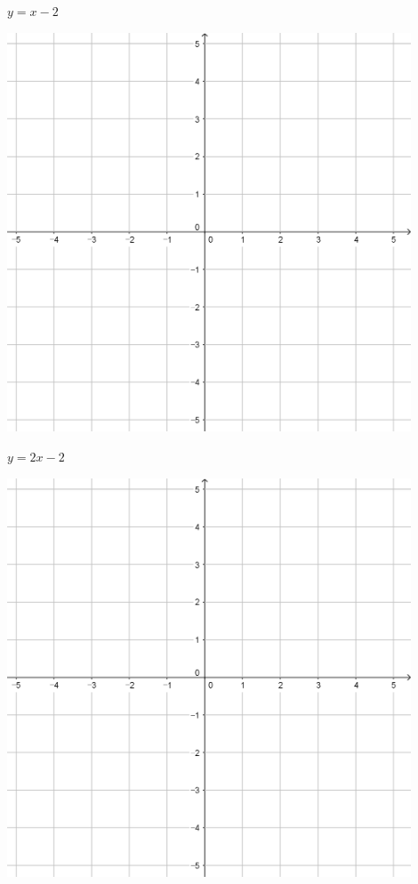\documentclass[a4paper]{oblivoir}
\begin{document}
\begin{minipage}{0.45\textwidth}\centering
\(y=x-2\)
\par\bigskip\includegraphics[width=0.9\textwidth]{55}
\end{minipage}
\begin{minipage}{0.45\textwidth}\centering
\(y=2x-2\)
\par\bigskip\includegraphics[width=0.9\textwidth]{55}
\end{minipage}\bigskip\bigskip\par
\end{document}

